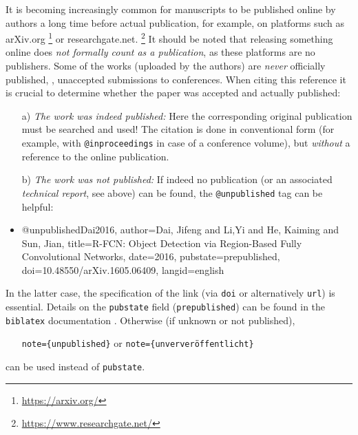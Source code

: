 It is becoming increasingly common for manuscripts to be published online by
authors a long time before actual publication, for example, on platforms such as
\textsf{arXiv.org}%
\footnote{\url{https://arxiv.org/}}
or \textsf{researchgate.net}.%
\footnote{\url{https://www.researchgate.net/}}
It should be noted that releasing something online does \emph{not formally
count as a publication}, as these platforms are no publishers. Some of the
works (uploaded by the authors) are \emph{never} officially published, \eg,
unaccepted submissions to conferences. When citing this reference it is crucial
to determine whether the paper was accepted and actually published:
%
\begin{itemize}
\item[a)]
\emph{The work was indeed published:} Here the corresponding original
publication must be searched and used! The citation is done in conventional form
(for example, with \texttt{@inproceedings} in case of a conference volume), but
\emph{without} a reference to the online publication.
\item[b)]
\emph{The work was \emph{not} published:} If indeed no publication (or an
associated \emph{technical report}, see above) can be found, the
\texttt{@unpublished} tag can be helpful:
\item %
\begin{GenericCode}[numbers=none]
@unpublished{Dai2016,
  author={Dai, Jifeng and Li,Yi and He, Kaiming and Sun, Jian},
  title={{R-FCN:} Object Detection via Region-Based Fully Convolutional Networks},
  date={2016},
  pubstate={prepublished},
  doi={10.48550/arXiv.1605.06409},
  langid={english}
}
\end{GenericCode}
\begin{itemize}
\item[\cite{Dai2016}] 
\end{itemize}
%
\end{itemize}
%
In the latter case, the specification of the link (via \texttt{doi} or alternatively
\texttt{url}) is essential. Details on the \texttt{pubstate} field
(\texttt{prepublished}) can be found in the \texttt{biblatex} documentation
\cite[Sec.\ 4.9.2.11]{Kime2022}. Otherwise (if unknown or not published),
%
\begin{itemize}
\item[]\texttt{note=\{unpublished\}} \quad or
   \quad \texttt{note=\{unververöffentlicht\}}
\end{itemize}
%
can be used instead of \texttt{pubstate}.


